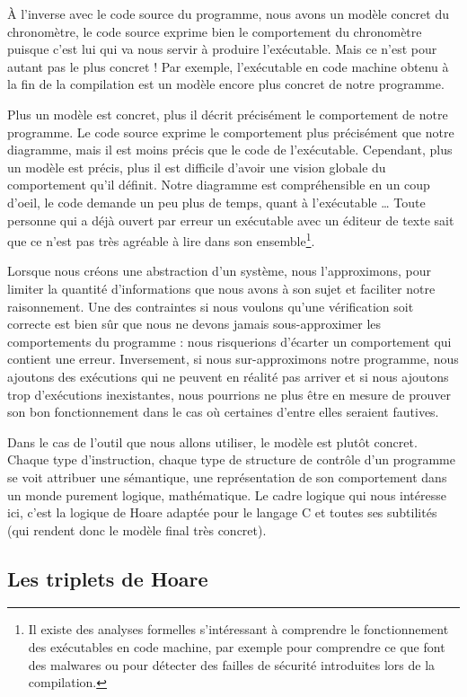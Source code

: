 \documentclass[12pt,francais,]{scrbook}
\begin{document}
À l'inverse avec le code source du programme, nous avons un modèle
concret du chronomètre, le code source exprime bien le comportement du
chronomètre puisque c'est lui qui va nous servir à produire
l'exécutable. Mais ce n'est pour autant pas le plus concret ! Par
exemple, l'exécutable en code machine obtenu à la fin de la compilation
est un modèle encore plus concret de notre programme.

Plus un modèle est concret, plus il décrit précisément le comportement
de notre programme. Le code source exprime le comportement plus
précisément que notre diagramme, mais il est moins précis que le code de
l'exécutable. Cependant, plus un modèle est précis, plus il est
difficile d'avoir une vision globale du comportement qu'il définit.
Notre diagramme est compréhensible en un coup d'oeil, le code demande un
peu plus de temps, quant à l'exécutable \ldots{} Toute personne qui a
déjà ouvert par erreur un exécutable avec un éditeur de texte sait que
ce n'est pas très agréable à lire dans son ensemble\footnote{Il existe
  des analyses formelles s'intéressant à comprendre le fonctionnement
  des exécutables en code machine, par exemple pour comprendre ce que
  font des malwares ou pour détecter des failles de sécurité introduites
  lors de la compilation.}.

Lorsque nous créons une abstraction d'un système, nous l'approximons,
pour limiter la quantité d'informations que nous avons à son sujet et
faciliter notre raisonnement. Une des contraintes si nous voulons qu'une
vérification soit correcte est bien sûr que nous ne devons jamais
sous-approximer les comportements du programme : nous risquerions
d'écarter un comportement qui contient une erreur. Inversement, si nous
sur-approximons notre programme, nous ajoutons des exécutions qui ne
peuvent en réalité pas arriver et si nous ajoutons trop d'exécutions
inexistantes, nous pourrions ne plus être en mesure de prouver son bon
fonctionnement dans le cas où certaines d'entre elles seraient fautives.

Dans le cas de l'outil que nous allons utiliser, le modèle est plutôt
concret. Chaque type d'instruction, chaque type de structure de contrôle
d'un programme se voit attribuer une sémantique, une représentation de
son comportement dans un monde purement logique, mathématique. Le cadre
logique qui nous intéresse ici, c'est la logique de Hoare adaptée pour
le langage C et toutes ses subtilités (qui rendent donc le modèle final
très concret).

\subsection{Les triplets de Hoare}\label{les-triplets-de-hoare}
\end{document}

